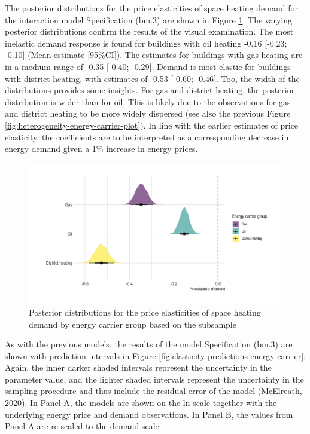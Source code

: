 \documentclass[12pt,twoside]{reedthesis}
\begin{document}
The posterior distributions for the price elasticities of space heating demand for the interaction model Specification (bm.3) are shown in Figure \ref{fig:posterior-distribution-interaction}. The varying posterior distributions confirm the results of the visual examination. The most inelastic demand response is found for buildings with oil heating -0.16 {[}-0.23; -0.10{]} (Mean estimate {[}95\%CI{]}). The estimates for buildings with gas heating are in a medium range of -0.35 {[}-0.40; -0.29{]}. Demand is most elastic for buildings with district heating, with estimates of -0.53 {[}-0.60; -0.46{]}. Too, the width of the distributions provides some insights. For gas and district heating, the posterior distribution is wider than for oil. This is likely due to the observations for gas and district heating to be more widely dispersed (see also the previous Figure \ref{fig:heterogeneity-energy-carrier-plot}). In line with the earlier estimates of price elasticity, the coefficients are to be interpreted as a corresponding decrease in energy demand given a 1\% increase in energy prices.
\begin{figure}

{\centering \includegraphics[width=1\linewidth]{figure/posterior-distribution-interaction} 

}

\caption{Posterior distributions for the price elasticities of space heating demand by energy carrier group based on the subsample}\label{fig:posterior-distribution-interaction}
\end{figure}
As with the previous models, the results of the model Specification (bm.3) are shown with prediction intervals in Figure \ref{fig:elasticity-predictions-energy-carrier}. Again, the inner darker shaded intervals represent the uncertainty in the parameter value, and the lighter shaded intervals represent the uncertainty in the sampling procedure and thus include the residual error of the model (\protect\hyperlink{ref-mcelreath20}{McElreath, 2020}). In Panel A, the models are shown on the ln-scale together with the underlying energy price and demand observations. In Panel B, the values from Panel A are re-scaled to the demand scale.
\end{document}

